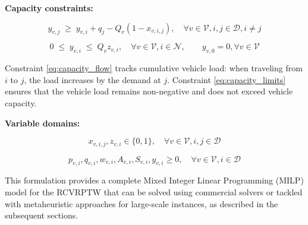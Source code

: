 \textbf{Capacity constraints:}

\begin{equation}\label{eq:capacity_flow}
y_{v,j} \;\ge\; y_{v,i} + q_j - Q_v(1 - x_{v,i,j}), \quad \forall v \in \mathcal{V}, i,j \in \mathcal{D}, i \neq j
\end{equation}

\begin{equation}\label{eq:capacity_limits}
0 \;\le\; y_{v,i} \;\le\; Q_v z_{v,i}, \quad \forall v \in \mathcal{V}, i \in \mathcal{N}, \qquad y_{v,0} = 0, \forall v \in \mathcal{V}
\end{equation}

Constraint \eqref{eq:capacity_flow} tracks cumulative vehicle load: when traveling from $i$ to $j$, the load increases by the demand at $j$. Constraint \eqref{eq:capacity_limits} ensures that the vehicle load remains non-negative and does not exceed vehicle capacity.

\textbf{Variable domains:}

\begin{equation}
     x_{v,i,j}, z_{v,i}\in\{0,1\}, \quad \forall v \in \mathcal{V}, i,j \in \mathcal{D}
\end{equation}

\begin{equation}
     p_{v,i}, q_{v,i}, w_{v,i}, A_{v,i}, S_{v,i}, y_{v,i} \geq 0, \quad \forall v \in \mathcal{V}, i \in \mathcal{D}
\end{equation}

This formulation provides a complete Mixed Integer Linear Programming (MILP) model for the RCVRPTW that can be solved using commercial solvers or tackled with metaheuristic approaches for large-scale instances, as described in the subsequent sections.
